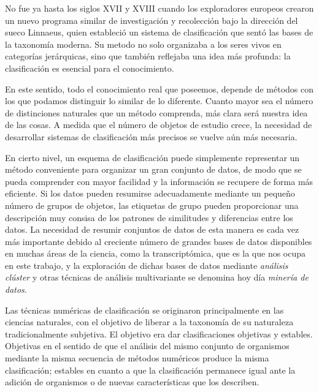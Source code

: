 No fue ya hasta los siglos XVII y XVIII cuando los exploradores europeos crearon un nuevo programa similar de investigación y recolección bajo la dirección del 
sueco Linnaeus, quien estableció un sistema de clasificación que sentó las bases de la taxonomía moderna. Su metodo no solo organizaba a los seres vivos
en categorías jerárquicas, sino que también reflejaba una idea más profunda: la clasificación es esencial para el conocimiento. \newline

En este sentido, todo el conocimiento real que poseemos, depende de métodos con los que podamos distinguir lo similar de lo diferente. Cuanto mayor sea el 
número de distinciones naturales que un método comprenda, más clara será nuestra idea de las cosas. A medida que el número de objetos de estudio crece, la 
necesidad de desarrollar sistemas de clasificación más precisos se vuelve aún más necesaria. \newline

En cierto nivel, un esquema de clasificación puede simplemente representar un método conveniente para organizar un gran conjunto de datos, de modo que se pueda
comprender con mayor facilidad y la información se recupere de forma más eficiente. Si los datos pueden resumirse adecuadamente mediante un pequeño número de grupos
de objetos, las etiquetas de grupo pueden proporcionar una descripción muy consisa de los patrones de similitudes y diferencias entre los datos. La necesidad de 
resumir conjuntos de datos de esta manera es cada vez más importante debido al creciente número de grandes bases de datos disponibles en muchas áreas de la ciencia,
como la transcriptómica, que es la que nos ocupa en este trabajo, y la exploración de dichas bases de datos mediante \textit{análisis clúster} y otras técnicas de 
análisis multivariante se denomina hoy día \textit{minería de datos}. \newline

Las técnicas numéricas de clasificación se originaron principalmente en las ciencias naturales, con el objetivo de liberar a la taxonomía de su naturaleza tradicionalmente
subjetiva. El objetivo era dar clasificaciones objetivas y estables. Objetivas en el sentido de que el análisis del mismo conjunto de organismos mediante la misma 
secuencia de métodos numéricos produce la misma clasificación; estables en cuanto a que la clasificación permanece igual ante la adición de organismos o de nuevas
características que los describen. \newline

